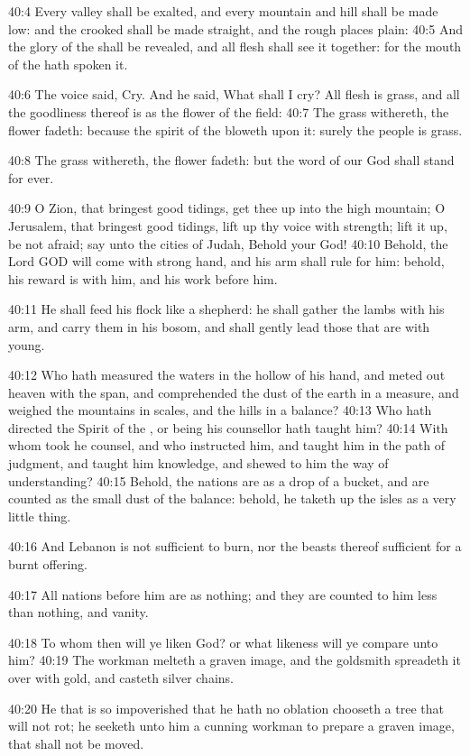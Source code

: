 40:4 Every valley shall be exalted, and every mountain and hill shall be made low: and the crooked shall be made straight, and the rough places plain: 40:5 And the glory of the \LORD shall be revealed, and all flesh shall see it together: for the mouth of the \LORD hath spoken it.

40:6 The voice said, Cry. And he said, What shall I cry? All flesh is grass, and all the goodliness thereof is as the flower of the field: 40:7 The grass withereth, the flower fadeth: because the spirit of the \LORD bloweth upon it: surely the people is grass.

40:8 The grass withereth, the flower fadeth: but the word of our God shall stand for ever.

40:9 O Zion, that bringest good tidings, get thee up into the high mountain; O Jerusalem, that bringest good tidings, lift up thy voice with strength; lift it up, be not afraid; say unto the cities of Judah, Behold your God!  40:10 Behold, the Lord GOD will come with strong hand, and his arm shall rule for him: behold, his reward is with him, and his work before him.

40:11 He shall feed his flock like a shepherd: he shall gather the lambs with his arm, and carry them in his bosom, and shall gently lead those that are with young.

40:12 Who hath measured the waters in the hollow of his hand, and meted out heaven with the span, and comprehended the dust of the earth in a measure, and weighed the mountains in scales, and the hills in a balance?  40:13 Who hath directed the Spirit of the \LORD, or being his counsellor hath taught him?  40:14 With whom took he counsel, and who instructed him, and taught him in the path of judgment, and taught him knowledge, and shewed to him the way of understanding?  40:15 Behold, the nations are as a drop of a bucket, and are counted as the small dust of the balance: behold, he taketh up the isles as a very little thing.

40:16 And Lebanon is not sufficient to burn, nor the beasts thereof sufficient for a burnt offering.

40:17 All nations before him are as nothing; and they are counted to him less than nothing, and vanity.

40:18 To whom then will ye liken God? or what likeness will ye compare unto him?  40:19 The workman melteth a graven image, and the goldsmith spreadeth it over with gold, and casteth silver chains.

40:20 He that is so impoverished that he hath no oblation chooseth a tree that will not rot; he seeketh unto him a cunning workman to prepare a graven image, that shall not be moved.

